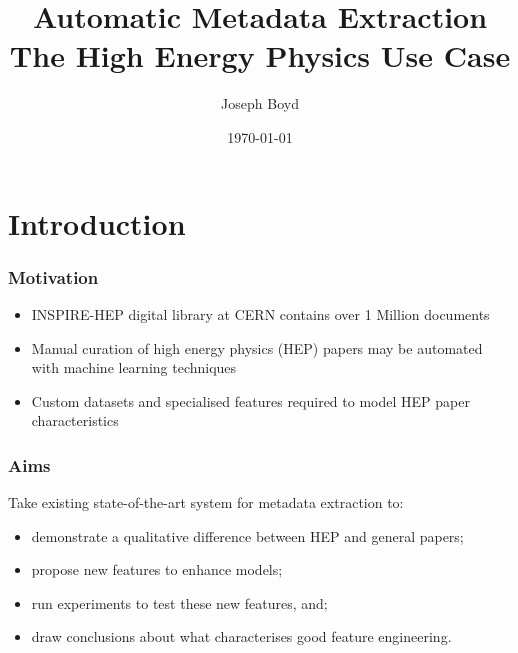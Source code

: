 \documentclass{beamer}
\title[Automatic Metadata Extraction]{Automatic Metadata Extraction \\ The High Energy Physics Use Case} %
\author{Joseph Boyd} %
\institute[EPFL] %
{
\'Ecole Polytechnique F\'ed\'erale de Lausanne \\ %
\medskip
\textit{joseph.boyd@epfl.ch} %
}
\date{\today} %
\begin{document}
\begin{frame}
\titlepage %
\end{frame}


\section{Introduction}


\begin{frame}
\frametitle{Motivation}
\begin{itemize}
\item INSPIRE-HEP digital library at CERN contains over 1 Million documents
\item Manual curation of high energy physics (HEP) papers may be automated with machine learning techniques
\item Custom datasets and specialised features required to model HEP paper characteristics
\end{itemize}
\end{frame}


\begin{frame}
\frametitle{Aims}
Take existing state-of-the-art system for metadata extraction to:
\begin{itemize}
\item demonstrate a qualitative difference between HEP and general papers;
\item propose new features to enhance models;
\item run experiments to test these new features, and;
\item draw conclusions about what characterises good feature engineering.
\end{itemize}
\end{frame}

\end{document}

